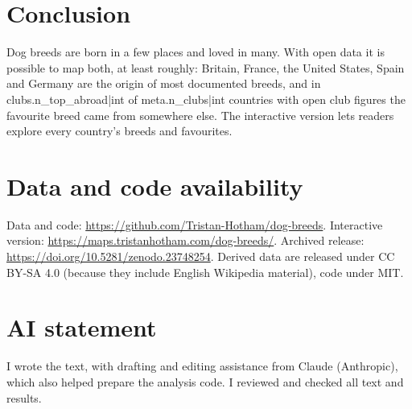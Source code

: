 \documentclass[11pt,a4paper]{article}
\begin{document}
\section{Conclusion}
Dog breeds are born in a few places and loved in many. With open data it is possible to map both, at least roughly: Britain, France, the United States, Spain and Germany are the origin of most documented breeds, and in {{clubs.n_top_abroad|int}} of {{meta.n_clubs|int}} countries with open club figures the favourite breed came from somewhere else. The interactive version lets readers explore every country's breeds and favourites.

\section*{Data and code availability}
Data and code: \url{https://github.com/Tristan-Hotham/dog-breeds}. Interactive version: \url{https://maps.tristanhotham.com/dog-breeds/}. Archived release: \url{https://doi.org/10.5281/zenodo.23748254}. Derived data are released under CC BY-SA 4.0 (because they include English Wikipedia material), code under MIT.

\section*{AI statement}
I wrote the text, with drafting and editing assistance from Claude (Anthropic), which also helped prepare the analysis code. I reviewed and checked all text and results.
\end{document}
